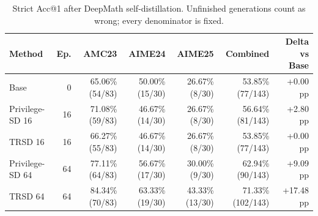 \begin{table}[t]
\centering
\small
\caption{Strict Acc@1 after DeepMath self-distillation. Unfinished generations count as wrong; every denominator is fixed.}
\label{tab:trsd-main-accuracy}
\begin{tabular}{lrrrrrr}
\toprule
Method & Ep. & AMC23 & AIME24 & AIME25 & Combined & Delta vs Base \\
\midrule
Base & 0 & 65.06\% (54/83) & 50.00\% (15/30) & 26.67\% (8/30) & 53.85\% (77/143) & +0.00 pp \\
Privilege-SD 16 & 16 & 71.08\% (59/83) & 46.67\% (14/30) & 26.67\% (8/30) & 56.64\% (81/143) & +2.80 pp \\
TRSD 16 & 16 & 66.27\% (55/83) & 46.67\% (14/30) & 26.67\% (8/30) & 53.85\% (77/143) & +0.00 pp \\
Privilege-SD 64 & 64 & 77.11\% (64/83) & 56.67\% (17/30) & 30.00\% (9/30) & 62.94\% (90/143) & +9.09 pp \\
TRSD 64 & 64 & 84.34\% (70/83) & 63.33\% (19/30) & 43.33\% (13/30) & 71.33\% (102/143) & +17.48 pp \\
\bottomrule
\end{tabular}
\end{table}
